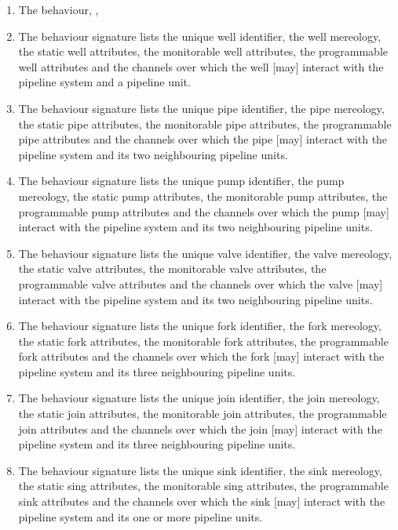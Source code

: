 \label{pipe:Behaviour Signatures}
%

\begin{enumerate}\setei
\item \label{ls-beh-110} The  behaviour, , 
\item \label{ls-beh-120} The  behaviour signature lists the
  unique well identifier, the well mereology, the static well
  attributes, the monitorable well attributes, the programmable well
  attributes and the channels over which the well [may] interact with
  the pipeline system and a pipeline unit.
\item \label{ls-beh-130} The  behaviour signature lists the
  unique pipe identifier, the pipe mereology, the static pipe
  attributes, the monitorable pipe attributes, the programmable pipe
  attributes and the channels over which the pipe [may] interact with
  the pipeline system and its two neighbouring pipeline units.
\mnewfoil
\item \label{ls-beh-140} The  behaviour signature lists the
  unique pump identifier, the pump mereology, the static pump
  attributes, the monitorable pump attributes, the programmable pump
  attributes and the channels over which the pump [may] interact with
  the pipeline system and its two neighbouring pipeline units. 
\item \label{ls-beh-150} The  behaviour signature lists the
  unique valve identifier, the valve mereology, the static valve
  attributes, the monitorable valve attributes, the programmable valve
  attributes and the channels over which the valve [may] interact with
  the pipeline system and its two neighbouring pipeline units.
\mnewfoil
\item \label{ls-beh-160} The  behaviour signature lists the
  unique fork identifier, the fork mereology, the static fork
  attributes, the monitorable fork attributes, the programmable fork
  attributes and the channels over which the fork [may] interact with
  the pipeline system and its three neighbouring pipeline units.
\item \label{ls-beh-170} The  behaviour signature lists the
  unique join identifier, the join mereology, the static join
  attributes, the monitorable join attributes, the programmable join
  attributes and the channels over which the join [may] interact with
  the pipeline system and its three neighbouring pipeline units.
\mnewfoil
\item \label{ls-beh-180} The  behaviour signature lists the
  unique sink identifier, the sink mereology, the static sing
  attributes, the monitorable sing attributes, the programmable sink
  attributes and the channels over which the sink [may] interact with
  the pipeline system and its one or more pipeline units.
\savei\end{enumerate}
